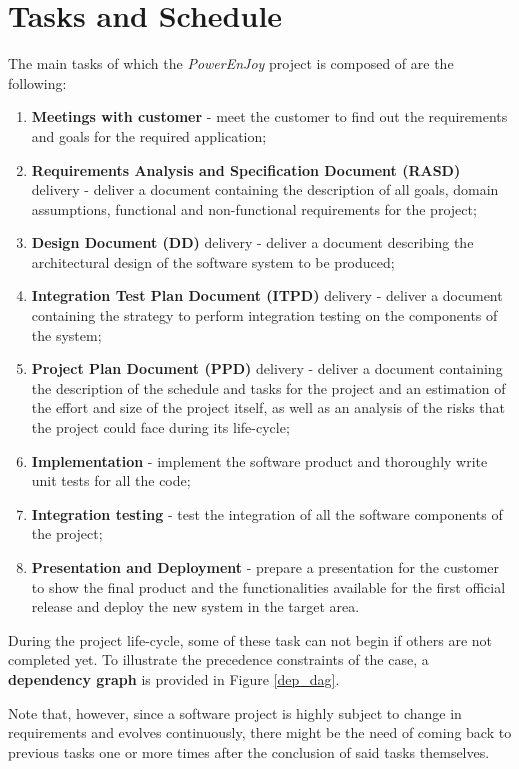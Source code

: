 \section{Tasks and Schedule}
The main tasks of which the \textit{PowerEnJoy} project is composed of are the following:
\begin{enumerate}
\item \textbf{Meetings with customer} - meet the customer to find out the requirements and goals for the required application;
\item \textbf{Requirements Analysis and Specification Document (RASD)} delivery - deliver a document containing the description of all goals, domain assumptions, functional and non-functional requirements for the project;
\item \textbf{Design Document (DD)} delivery - deliver a document describing the architectural design of the software system to be produced;
\item \textbf{Integration Test Plan Document (ITPD)} delivery - deliver a document containing the strategy to perform integration testing on the components of the system;
\item \textbf{Project Plan Document (PPD)} delivery - deliver a document containing the description of the schedule and tasks for the project and an estimation of the effort and size of the project itself, as well as an analysis of the risks that the project could face during its life-cycle;
\item \textbf{Implementation} - implement the software product and thoroughly write unit tests for all the code;
\item \textbf{Integration testing} - test the integration of all the software components of the project;
\item \textbf{Presentation and Deployment} - prepare a presentation for the customer to show the final product and the functionalities available for the first official release and deploy the new system in the target area.
\end{enumerate}

During the project life-cycle, some of these task can not begin if others are not completed yet. To illustrate the precedence constraints of the case, a \textbf{dependency graph} is provided in Figure \ref{dep_dag}.

Note that, however, since a software project is highly subject to change in requirements and evolves continuously, there might be the need of coming back to previous tasks one or more times after the conclusion of said tasks themselves.

